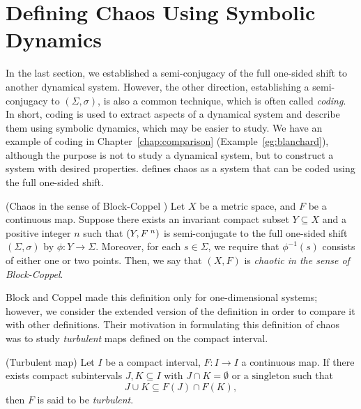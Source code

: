 \documentclass[10pt,twoside]{book}
\begin{document}
\section{Defining Chaos Using Symbolic Dynamics}
In the last section, we established a semi-conjugacy of the full one-sided shift to another dynamical system.
However, the other direction, establishing a semi-conjugacy to $(\Sigma, \sigma)$, is also a common technique, which is often called \textit{coding}.
In short, coding is used to extract aspects of a dynamical system and describe them using symbolic dynamics, which may be easier to study.
We have an example of coding in Chapter~\ref{chap:comparison} (Example~\ref{eg:blanchard}), although the purpose is not to study a dynamical system, but to construct a system with desired properties.
\citet{blockcoppel} defines chaos as a system that can be coded using the full one-sided shift.
\begin{definition}
  (Chaos in the sense of Block-Coppel \citep{blockcoppel})
  Let $X$ be a metric space, and $F$ be a continuous map.
  Suppose there exists an invariant compact subset $Y \subseteq X$ and a positive integer $n$ such that $(Y,F^{\;n})$ is semi-conjugate to the full one-sided shift $(\Sigma, \sigma)$ by $\phi: Y \to \Sigma$.
  Moreover, for each $s \in \Sigma$, we require that $\phi^{-1}(s)$ consists of either one or two points.
  Then, we say that $(X,F)$ is \textit{chaotic in the sense of Block-Coppel}.
  \begin{center}
  \end{center}
  \label{defn:blockcoppel}
\end{definition}
Block and Coppel made this definition only for one-dimensional systems; however, we consider the extended version of the definition in order to compare it with other definitions.
Their motivation in formulating this definition of chaos was to study \textit{turbulent} maps defined on the compact interval.
\begin{definition}
  (Turbulent map)
  Let $I$ be a compact interval, $F: I \to I$ a continuous map.
  If there exists compact subintervals $J,K \subseteq I$ with $J \cap K = \emptyset \mbox{ or a singleton}$ such that
  \begin{equation*}
    J \cup K \subseteq F(J) \cap F(K),
  \end{equation*}
  then $F$ is said to be \textit{turbulent}.
\end{definition}
\end{document}

